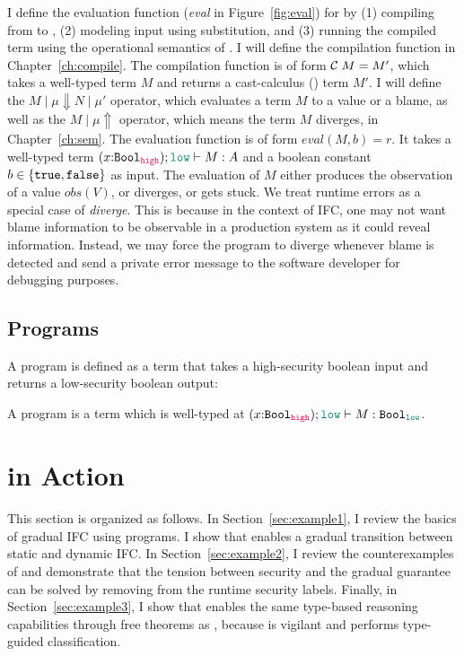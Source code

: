 {I define the evaluation function (\textit{eval} in Figure~\ref{fig:eval}) for
\Surface by (1) compiling from \Surface to \CC, (2) modeling input using
substitution, and (3) running the compiled \CC term using the operational
semantics of \CC. I will define the compilation function in
Chapter~\ref{ch:compile}. The compilation function is of form $\mathcal{C}\;{M} =
M'$, which takes a well-typed \Surface term $M$ and returns a cast-calculus
(\CC) term $M'$. I will define the $M \mid \mu \Downarrow N \mid \mu'$ operator,
which evaluates a \CC term $M$ to a value or a blame, as well as the $M \mid \mu
\Uparrow$ operator, which means the \CC term $M$ diverges, in
Chapter~\ref{ch:sem}. The evaluation function is of form $\mathit{eval}(M,b)=r$.
It takes a well-typed \Surface term $(x{:}\Bool_{\high}) ; \low \vdash M : A$
and a boolean constant $b \in \{\mathtt{true}, \mathtt{false}\}$ as input. The evaluation of $M$
either produces the observation of a value $\mathit{obs}(V)$, or diverges, or
gets stuck. We treat runtime errors as a special case of \textit{diverge}. This
is because in the context of IFC, one may not want blame information to be
observable in a production system as it could reveal information. Instead, we
may force the program to diverge whenever blame is detected and send a private
error message to the software developer for debugging purposes.

\subsection{\Surface Programs}
\label{sec:surface-programs}

A \Surface program is defined as a \Surface term that takes a high-security
boolean input and returns a low-security boolean output:

\begin{definition}
  \label{def:surface-program}
  A \Surface program is a \Surface term which is well-typed at
  $(x{:}\Bool_{\high});\low\vdash M : \Bool_{\low}$.
\end{definition}

}  %

\section{\Surface in Action}
\label{sec:examples}

This section is organized as follows. In Section~\ref{sec:example1}, I review
the basics of gradual IFC using \Surface programs. I show that \Surface enables
a gradual transition between static and dynamic IFC. In
Section~\ref{sec:example2}, I review the counterexamples of
\textcite{Toro:2018aa} and demonstrate that the tension between security and the
gradual guarantee can be solved by removing \unk from the runtime security
labels. Finally, in Section~\ref{sec:example3}, I show that \Surface enables the
same type-based reasoning capabilities through free theorems as \GSLRef, because
\Surface is vigilant and performs type-guided classification.

